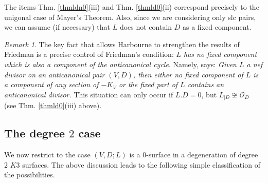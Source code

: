 \documentclass{amsart}
\numberwithin{equation}{section}
\theoremstyle{plain}
\theoremstyle{remark}
\newtheorem{remark}[equation]{Remark}
\theoremstyle{definition}
\newcommand{\calO}{\mathcal{O}}
\begin{document}
The items Thm. \ref{thmldn0}(iii) and Thm. \ref{thmld0}(ii) correspond precisely to the unigonal case of Mayer's Theorem. Also, since we are considering only slc pairs, we can assume (if necessary) that $L$ does not contain $D$ as  a fixed component.


\begin{remark}
The key fact that allows Harbourne \cite{har1,har2} to strengthen the results of Friedman \cite{friedmanlin}  is a precise control of Friedman's condition: {\it $L$ has no fixed component which is also a component of the anticanonical cycle}. Namely, \cite[Cor. III.3]{har1} says: {\it Given $L$ a nef divisor on an anticanonical pair $(V,D)$, then either no fixed component of $L$ is a component of any section of $-K_V$ or the fixed part of $L$ contains an anticanonical divisor.} This situation can only occur if $L.D=0$, but $L_{\mid D}\not\cong \calO_D$ (see Thm. \ref{thmld0}(iii) above). 
\end{remark}

\subsection{The degree $2$ case}
We now restrict to the case $(V,D;L)$ is a $0$-surface in a degeneration of degree $2$ $K3$ surfaces. The above discussion leads to the following simple classification of the possibilities. 
\end{document}
